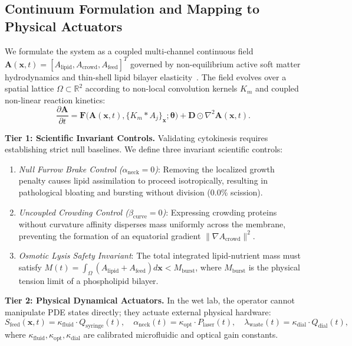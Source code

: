 \documentclass{article}
\begin{document}
\subsection{Continuum Formulation and Mapping to Physical Actuators}

We formulate the system as a coupled multi-channel continuous field $\mathbf{A}(\mathbf{x}, t) = [A_{\text{lipid}}, A_{\text{crowd}}, A_{\text{feed}}]^T$ governed by non-equilibrium active soft matter hydrodynamics and thin-shell lipid bilayer elasticity~\citep{marchetti2013hydrodynamics, helfrich1973elastic}. The field evolves over a spatial lattice $\Omega \subset \mathbb{R}^2$ according to non-local convolution kernels $K_m$ and coupled non-linear reaction kinetics:
\begin{equation}
\frac{\partial \mathbf{A}}{\partial t} = \mathbf{F}\Big(\mathbf{A}(\mathbf{x}, t), \{K_m * A_j\}_{\mathbf{x}}; \boldsymbol{\theta}\Big) + \mathbf{D} \odot \nabla^2 \mathbf{A}(\mathbf{x}, t).
\label{eq:field_pde}
\end{equation}

\textbf{Tier 1: Scientific Invariant Controls.} Validating cytokinesis requires establishing strict null baselines. We define three invariant scientific controls:
\begin{enumerate}
    \item \textit{Null Furrow Brake Control ($\alpha_{\text{neck}} = 0$)}: Removing the localized growth penalty causes lipid assimilation to proceed isotropically, resulting in pathological bloating and bursting without division (0.0\% scission).
    \item \textit{Uncoupled Crowding Control ($\beta_{\text{curve}} = 0$)}: Expressing crowding proteins without curvature affinity disperses mass uniformly across the membrane, preventing the formation of an equatorial gradient $\|\nabla A_{\text{crowd}}\|^2$.
    \item \textit{Osmotic Lysis Safety Invariant}: The total integrated lipid-nutrient mass must satisfy $M(t) = \int_{\Omega} (A_{\text{lipid}} + A_{\text{feed}}) d\mathbf{x} < M_{\text{burst}}$, where $M_{\text{burst}}$ is the physical tension limit of a phospholipid bilayer.
\end{enumerate}

\textbf{Tier 2: Physical Dynamical Actuators.} In the wet lab, the operator cannot manipulate PDE states directly; they actuate external physical hardware:
\begin{equation}
S_{\text{feed}}(\mathbf{x}, t) = \kappa_{\text{fluid}} \cdot Q_{\text{syringe}}(t), \quad \alpha_{\text{neck}}(t) = \kappa_{\text{opt}} \cdot P_{\text{laser}}(t), \quad \lambda_{\text{waste}}(t) = \kappa_{\text{dial}} \cdot Q_{\text{dial}}(t),
\label{eq:actuator_coupling}
\end{equation}
where $\kappa_{\text{fluid}}, \kappa_{\text{opt}}, \kappa_{\text{dial}}$ are calibrated microfluidic and optical gain constants.
\end{document}

